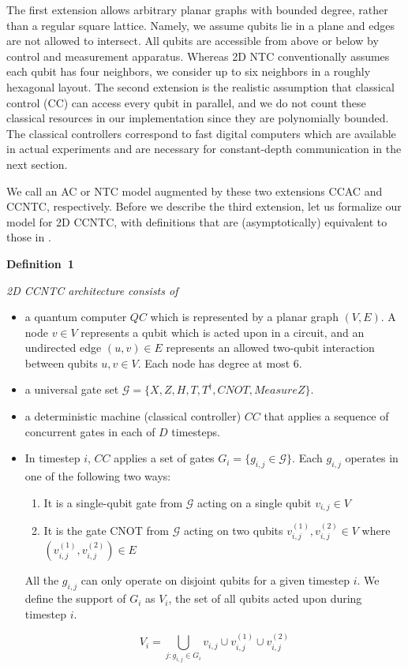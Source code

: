 \documentclass[twoside]{article}
\begin{document}
The first extension allows arbitrary planar graphs
with bounded degree, rather than a regular square lattice.
Namely, we assume qubits lie in a plane and edges are not allowed to intersect.
All qubits are accessible from above
or below by control and measurement apparatus.
Whereas 2D NTC conventionally assumes each qubit
has four neighbors, we consider up to six neighbors in a roughly hexagonal
layout. The second extension is the realistic assumption
that classical control (CC) can
access every qubit in parallel, and we do not count these classical
resources in our implementation since they are polynomially bounded. The
classical controllers
correspond to fast digital computers which are
available in actual experiments and are necessary for constant-depth
communication in the next section.

We call an AC or NTC model augmented by these two extensions
\textsc{CCAC} and \textsc{CCNTC}, respectively. Before we describe the
third extension, let us formalize our model for \textsc{2D CCNTC}, with definitions that are (asymptotically) equivalent to those in 
\cite{Rosenbaum2012}.

{\noindent\bf Definition~1} {\it 2D CCNTC architecture consists of

\begin{itemize}
\item a quantum computer $QC$ which is represented by a planar graph $(V,E)$. A
node $v \in V$ represents a qubit which is acted upon in a circuit, and an
undirected edge $(u,v) \in E$ represents 
an allowed two-qubit interaction between qubits $u,v \in V$. Each node has
degree at most $6$.
\item a universal gate set $\mathcal{G} = \{X, Z, H, T, T^{\dagger}, CNOT, MeasureZ\}$.

\item a deterministic machine (classical controller) $CC$ that applies a sequence
of concurrent gates in each of $D$ timesteps.
\item In timestep $i$, $CC$ applies a set of
gates $G_i = \{g_{i,j} \in \mathcal{G} \}$.
Each $g_{i,j}$ operates in one of the following two ways:
\begin{enumerate}
\item It is a single-qubit gate from $\mathcal{G}$ acting on a single qubit $v_{i,j} \in V$
\item
It is the gate CNOT from $\mathcal{G}$ acting on two qubits $v^{(1)}_{i,j}, v^{(2)}_{i,j} \in V$ where
$(v^{(1)}_{i,j}, v^{(2)}_{i,j}) \in E$
\end{enumerate}
All the $g_{i,j}$ can only operate on
disjoint qubits for a given timestep $i$. We define the support of $G_i$
as $V_i$, the set of all qubits acted upon during timestep $i$.

\begin{equation}
V_i = \bigcup_{j: g_{i,j} \in G_i} v_{i,j} \cup v^{(1)}_{i,j} \cup v^{(2)}_{i,j}
\end{equation}

\end{itemize}}
\end{document}
